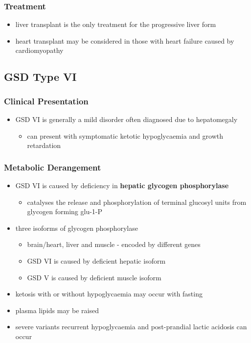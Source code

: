 \documentclass[12pt]{scrartcl}
\begin{document}
\subsubsection{Treatment}
\label{sec:org56293f6}
\begin{itemize}
\item liver transplant is the only treatment for the progressive liver form
\item heart transplant may be considered in those with heart failure caused by cardiomyopathy
\end{itemize}
\subsection{GSD Type VI}
\label{sec:org0c63c4f}
\subsubsection{Clinical Presentation}
\label{sec:orge0d014e}
\begin{itemize}
\item GSD VI is generally a mild disorder often diagnosed due to hepatomegaly
\begin{itemize}
\item can present with symptomatic ketotic hypoglycaemia and growth retardation
\end{itemize}
\end{itemize}
\subsubsection{Metabolic Derangement}
\label{sec:orgc534d09}
\begin{itemize}
\item GSD VI is caused by deficiency in \textbf{hepatic glycogen phosphorylase}
\begin{itemize}
\item catalyses the release and phosphorylation of terminal glucosyl units
from glycogen forming glu-1-P
\end{itemize}
\item three isoforms of glycogen phosphorylase
\begin{itemize}
\item brain/heart, liver and muscle - encoded by different genes
\item GSD VI is caused by deficient hepatic isoform
\item GSD V is caused by deficient muscle isoform
\end{itemize}
\item ketosis with or without hypoglycaemia may occur with fasting
\item plasma lipids may be raised
\item severe variants recurrent hypoglycaemia and post-prandial lactic
acidosis can occur
\end{itemize}
\end{document}
